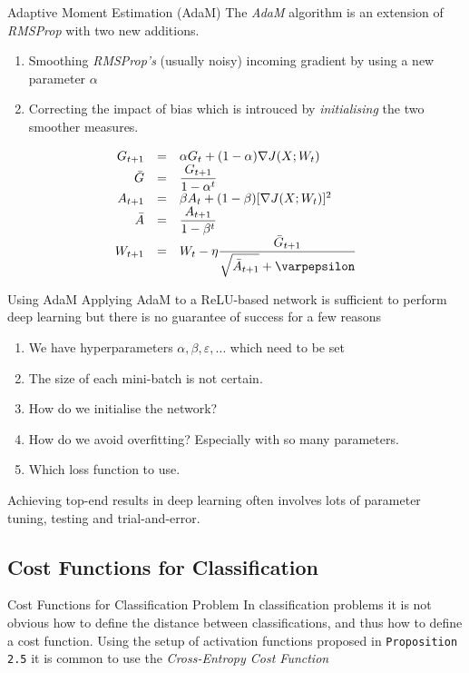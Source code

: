 \documentclass[11pt,a4paper]{article}
\begin{document}
\begin{proposition}{Adaptive Moment Estimation (AdaM)}
  The \textit{AdaM} algorithm is an extension of \textit{RMSProp} with two new additions.
  \begin{enumerate}
    \item Smoothing \textit{RMSProp's} (usually noisy) incoming gradient by using a new parameter $\alpha$
    \item Correcting the impact of bias which is introuced by \textit{initialising} the two smoother measures.
  \end{enumerate}
  \[\begin{array}{rcl}
    G_{t+1}&=&\alpha G_t+(1-\alpha)\nabla J(X;W_t)\\
    \bar{G}&=&\dfrac{G_{t+1}}{1-\alpha^t}\\
    A_{t+1}&=&\beta A_t+(1-\beta)[\nabla J(X;W_t)]^2\\
    \bar{A}&=&\dfrac{A_{t+1}}{1-\beta^t}\\
    W_{t+1}&=&W_t-\eta\dfrac{\bar{G}_{t+1}}{\sqrt{\bar{A}_{t+1}}+\varpepsilon}
  \end{array}\]
\end{proposition}

\begin{remark}{Using AdaM}
  Applying AdaM to a ReLU-based network is sufficient to perform deep learning but there is no guarantee of success for a few reasons
  \begin{enumerate}
    \item We have hyperparameters $\alpha,\beta,\varepsilon,\dots$ which need to be set
    \item The size of each mini-batch is not certain.
    \item How do we initialise the network?
    \item How do we avoid overfitting? Especially with so many parameters.
    \item Which loss function to use.
  \end{enumerate}
  Achieving top-end results in deep learning often involves lots of parameter tuning, testing and trial-and-error.
\end{remark}

\subsection{Cost Functions for Classification}

\begin{remark}{Cost Functions for Classification Problem}
  In classification problems it is not obvious how to define the distance between classifications, and thus how to define a cost function. Using the setup of activation functions proposed in \texttt{Proposition 2.5} it is common to use the \textit{Cross-Entropy Cost Function}
\end{remark}
\end{document}
